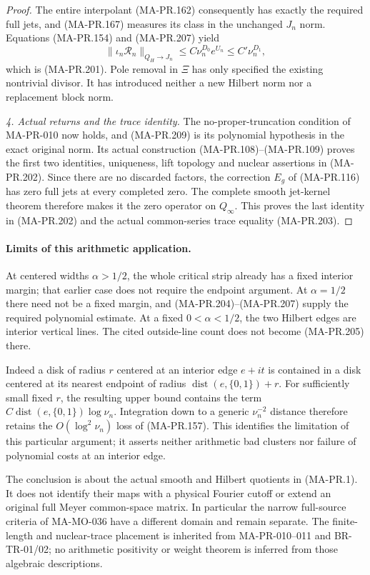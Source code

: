 \begin{proof}
The entire interpolant (MA-PR.162) consequently
has exactly the required full jets, and
(MA-PR.167) measures its class in the
unchanged \(J_n\) norm.  Equations
(MA-PR.154) and (MA-PR.207) yield
\[
      \|\iota_n\mathscr R_n\|_{Q_H\to J_n}
            \le C\nu_n^{D_0}e^{U_n}
            \le C'\nu_n^{D_1},
 \tag{MA-PR.209}
\]
which is (MA-PR.201).
Pole removal in \(\Xi\) has only specified
the existing nontrivial divisor.  It has
introduced neither a new Hilbert norm nor
a replacement block norm.

\emph{4. Actual returns and the trace identity.}
The no-proper-truncation condition of
MA-PR-010 now holds, and (MA-PR.209) is its
polynomial hypothesis in the exact original
norm.  Its actual construction
(MA-PR.108)--(MA-PR.109) proves the first
two identities, uniqueness, lift topology
and nuclear assertions in (MA-PR.202).
Since there are no discarded factors,
the correction \(E_g\) of (MA-PR.116) has
zero full jets at every completed zero.
The complete smooth jet-kernel theorem
therefore makes it the zero operator on
\(Q_\infty\).  This proves the last identity
in (MA-PR.202) and the actual common-series
trace equality (MA-PR.203).
\end{proof}

\paragraph{Limits of this arithmetic application.}
At centered widths \(\alpha>1/2\), the whole
critical strip already has a fixed interior
margin; that earlier case does not require
the endpoint argument.  At \(\alpha=1/2\)
there need not be a fixed margin, and
(MA-PR.204)--(MA-PR.207) supply the required
polynomial estimate.  At a fixed
\(0<\alpha<1/2\), the two Hilbert edges
are interior vertical lines.  The cited
outside-line count does not become
(MA-PR.205) there.

Indeed a disk of radius \(r\) centered at an
interior edge \(e+it\) is contained in a disk
centered at its nearest endpoint of radius
\(\operatorname{dist}(e,\{0,1\})+r\).
For sufficiently small fixed \(r\), the
resulting upper bound contains the term
\(C\operatorname{dist}(e,\{0,1\})\log\nu_n\).
Integration down to a generic
\(\nu_n^{-2}\) distance therefore retains
the \(O(\log^2\nu_n)\) loss of (MA-PR.157).
This identifies the limitation of this
particular argument; it asserts neither
arithmetic bad clusters nor failure of
polynomial costs at an interior edge.

The conclusion is about the actual smooth
and Hilbert quotients in (MA-PR.1).
It does not identify their maps with a
physical Fourier cutoff or extend an
original full Meyer common-space matrix.
In particular the narrow full-source
criteria of MA-MO-036 have a different
domain and remain separate.
The finite-length and nuclear-trace
placement is inherited from MA-PR-010--011
and BR-TR-01/02; no arithmetic positivity
or weight theorem is inferred from those
algebraic descriptions.

